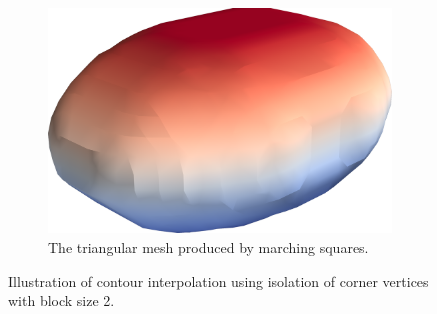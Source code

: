 \documentclass[a4paper,10pt]{report}
\begin{document}
\begin{figure}[H]
\begin{subfigure}{.32\textwidth}
        \includegraphics[width=\textwidth]{../images/3D/Ellipsoid_marching_squares_isolated_vertices.png}
    \caption{The triangular mesh produced by marching squares.}
    \label{fig:Ellipsoid_marching_squares_isolated_vertices}
    \end{subfigure}
    \caption{Illustration of contour interpolation using isolation of corner vertices with block size 2.}
    \label{fig:Ellipsoid_isolated_vertices}
\end{figure}
\end{document}
